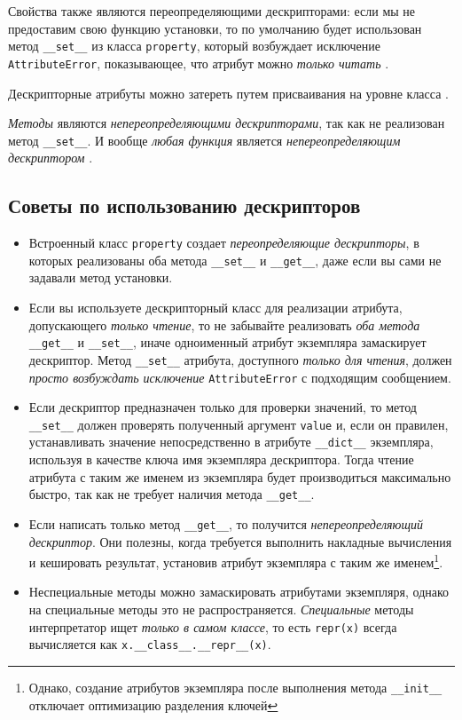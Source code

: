 \documentclass[%
	11pt,
	a4paper,
	utf8,
		]{article}
\begin{document}
Свойства также являются переопределяющими дескрипторами: если мы не предоставим свою функцию установки, то по умолчанию будет использован метод \verb*|__set__| из класса \verb|property|, который возбуждает исключение \verb*|AttributeError|, показывающее, что атрибут можно \emph{только читать} \cite[]{ramalho:python-2022}.

Дескрипторные атрибуты можно затереть путем присваивания на уровне класса \cite[]{ramalho:python-2022}.

\emph{Методы} являются \emph{непереопределяющими дескрипторами}, так как не реализован метод \verb|__set__|. И вообще \emph{любая функция} является \emph{непереопределяющим дескриптором} \cite[]{ramalho:python-2022}.

\subsection{Советы по использованию дескрипторов}

\begin{itemize}
	\item Встроенный класс \verb*|property| создает \emph{переопределяющие дескрипторы}, в которых реализованы оба метода \verb|__set__| и \verb*|__get__|, даже если вы сами не задавали метод установки.
	
	\item Если вы используете дескрипторный класс для реализации атрибута, допускающего \emph{только чтение}, то не забывайте реализовать \emph{оба метода} \verb|__get__| и \verb*|__set__|, иначе одноименный атрибут экземпляра замаскирует дескриптор. Метод \verb|__set__| атрибута, доступного \emph{только для чтения}, должен \emph{просто возбуждать исключение} \verb*|AttributeError| с подходящим сообщением.
	
	\item Если дескриптор предназначен только для проверки значений, то метод \verb|__set__| должен проверять полученный аргумент \verb*|value| и, если он правилен, устанавливать значение непосредственно в атрибуте \verb|__dict__| экземпляра, используя в качестве ключа имя экземпляра дескриптора. Тогда чтение атрибута с таким же именем из экземпляра будет производиться максимально быстро, так как не требует наличия метода \verb*|__get__|.
	
	\item Если написать только метод \verb|__get__|, то получится \emph{непереопределяющий дескриптор}. Они полезны, когда требуется выполнить накладные вычисления и кешировать результат, установив атрибут экземпляра с таким же именем\footnote{Однако, создание атрибутов экземпляра после выполнения метода \texttt{\_\_init\_\_} отключает оптимизацию разделения ключей}.
	
	\item Неспециальные методы можно замаскировать атрибутами экземпляря, однако на специальные методы это не распространяется. {\color{blue}\emph{Специальные} методы интерпретатор ищет \emph{только в самом классе}}, то есть \verb*|repr(x)| всегда вычисляется как \verb|x.__class__.__repr__(x)|.
\end{itemize}
\end{document}
